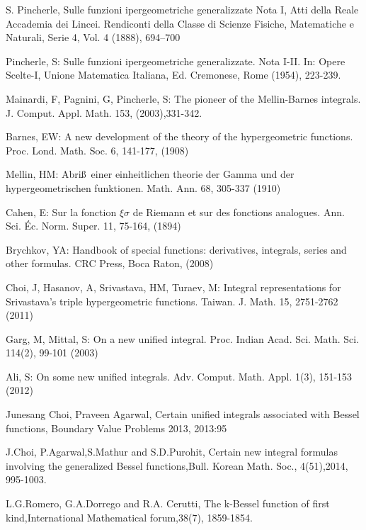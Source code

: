 \documentclass{amsart}
\theoremstyle{plain}
\numberwithin{equation}{section}
\begin{document}
\begin{thebibliography}{99}
 S. Pincherle, Sulle funzioni ipergeometriche
generalizzate Nota I, Atti della Reale Accademia dei Lincei. Rendiconti
della Classe di Scienze Fisiche, Matematiche e Naturali, Serie 4, Vol. 4
(1888), 694--700

 Pincherle, S: Sulle funzioni ipergeometriche
generalizzate. Nota I-II. In: Opere Scelte-I, Unione Matematica Italiana,
Ed. Cremonese, Rome (1954), 223-239.

 Mainardi, F, Pagnini, G, Pincherle, S: The pioneer of
the Mellin-Barnes integrals. J. Comput. Appl. Math. 153, (2003),331-342.

 Barnes, EW: A new development of the theory of the
hypergeometric functions. Proc. Lond. Math. Soc. 6, 141-177, (1908)

 Mellin, HM: Abri\ss\ einer einheitlichen theorie der Gamma
und der hypergeometrischen funktionen. Math. Ann. 68, 305-337 (1910)

 Cahen, E: Sur la fonction $\xi{\sigma}$ de Riemann et sur
des fonctions analogues. Ann. Sci. \'{E}c. Norm. Super. 11, 75-164, (1894)

 Brychkov, YA: Handbook of special functions: derivatives,
integrals, series and other formulas. CRC Press, Boca Raton, (2008)

 Choi, J, Hasanov, A, Srivastava, HM, Turaev, M: Integral
representations for Srivastava's triple hypergeometric functions. Taiwan. J.
Math. 15, 2751-2762 (2011)

 Garg, M, Mittal, S: On a new unified integral. Proc. Indian
Acad. Sci. Math. Sci. 114(2), 99-101 (2003)

 Ali, S: On some new unified integrals. Adv. Comput. Math.
Appl. 1(3), 151-153 (2012)

 Junesang Choi, Praveen Agarwal, Certain unified integrals
associated with Bessel functions, Boundary Value Problems 2013, 2013:95

 J.Choi, P.Agarwal,S.Mathur and S.D.Purohit, Certain
new integral formulas involving the generalized Bessel functions,Bull.
Korean Math. Soc., 4(51),2014, 995-1003.

 L.G.Romero, G.A.Dorrego and R.A. Cerutti, The
k-Bessel function of first kind,International Mathematical forum,38(7),
1859-1854.


\end{thebibliography}
\end{document}
